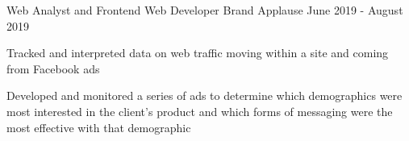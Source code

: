 \begin{cventries}
{\begin{cvitems}
      \end{cvitems}
    }
    \cventry
    {Web Analyst and Frontend Web Developer}
    {Brand Applause}
    {}
    {June 2019 - August 2019}
    {
      \begin{cvitems}
        \item {Tracked and interpreted data on web traffic moving within a site and coming from Facebook ads}
        \item {Developed and monitored a series of ads to determine which demographics were most interested in the client's product and which forms of messaging were the most effective with that demographic}
      \end{cvitems}
    }

\end{cventries}
